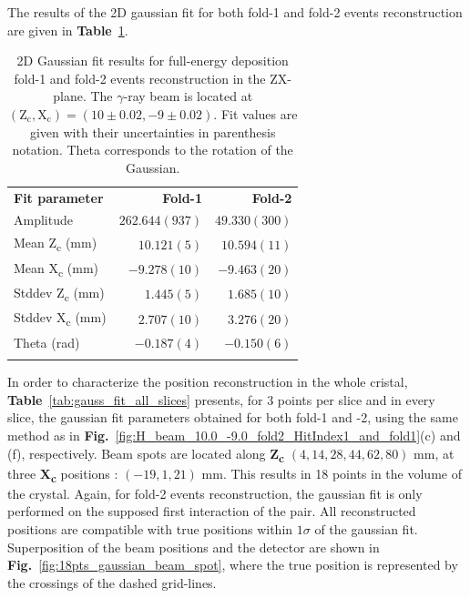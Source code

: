 The results of the 2D gaussian fit for both fold-1 and fold-2 events reconstruction are given in \textbf{Table}~\ref{tab:gaussian_fit_results_combined}.

\begin{table}[ht]
\centering
\caption{2D Gaussian fit results for full-energy deposition fold-1 and fold-2 events reconstruction in the ZX-plane. The $\gamma$-ray beam is located at $(\text{Z}_\text{c}, \text{X}_\text{c}) = (10\pm0.02, -9\pm0.02)$. Fit values are given with their uncertainties in parenthesis notation. Theta corresponds to the rotation of the Gaussian.}
\label{tab:gaussian_fit_results_combined}
\begin{tabular}{lrr}
\hline\noalign{\smallskip}
\textbf{Fit parameter} & \textbf{Fold-1} & \textbf{Fold-2} \\
\noalign{\smallskip}\hline\noalign{\smallskip}
Amplitude & $262.644(937)$ & $49.330(300)$ \\
Mean Z\textsubscript{c} (mm) & $10.121(5)$ & $10.594(11)$ \\
Mean X\textsubscript{c} (mm) & $-9.278(10)$ & $-9.463(20)$ \\
Stddev Z\textsubscript{c} (mm) & $1.445(5)$ & $1.685(10)$ \\
Stddev X\textsubscript{c} (mm) & $2.707(10)$ & $3.276(20)$ \\
Theta (rad) & $-0.187(4)$ & $-0.150(6)$ \\
\noalign{\smallskip}\hline
\end{tabular}
\end{table}

In order to characterize the position reconstruction in the whole cristal, \textbf{Table}~\ref{tab:gauss_fit_all_slices} presents, for 3 points per slice and in every slice, the gaussian fit parameters obtained for both fold-1 and -2, using the same method as in \textbf{Fig.}~\ref{fig:H_beam_10.0_-9.0_fold2_HitIndex1_and_fold1}(c) and (f), respectively. Beam spots are located along \textbf{Z\textsubscript{c}} $(4, 14, 28, 44, 62, 80)$ mm, at three \textbf{X\textsubscript{c}} positions : $(-19, 1, 21)$ mm. This results in 18 points in the volume of the crystal. Again, for fold-2 events reconstruction, the gaussian fit is only performed on the supposed first interaction of the pair. All reconstructed positions are compatible with true positions within $1\sigma$ of the gaussian fit. Superposition of the beam positions and the detector are shown in \textbf{Fig.}~\ref{fig:18pts_gaussian_beam_spot}, where the true position is represented by the crossings of the dashed grid-lines.

